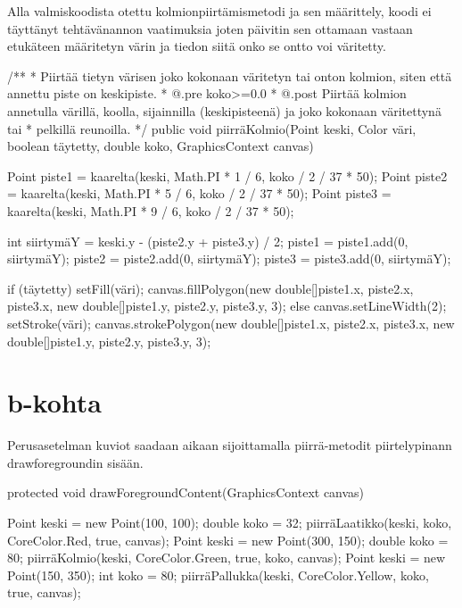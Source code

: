 Alla valmiskoodista otettu kolmionpiirtämismetodi ja sen määrittely, koodi ei täyttänyt
tehtävänannon vaatimuksia joten päivitin sen ottamaan vastaan etukäteen määritetyn värin ja
tiedon siitä onko se ontto voi väritetty.
\begin{javacode}
/**
* Piirtää tietyn värisen joko kokonaan väritetyn tai onton kolmion, siten että annettu piste on keskipiste.
* @.pre koko>=0.0
* @.post Piirtää kolmion annetulla värillä, koolla, sijainnilla (keskipisteenä) ja joko kokonaan väritettynä tai
* pelkillä reunoilla.
*/
    public void piirräKolmio(Point keski, Color väri, boolean täytetty, double koko, GraphicsContext canvas) {
        Point piste1 = kaarelta(keski, Math.PI * 1 / 6, koko / 2 / 37 * 50);
        Point piste2 = kaarelta(keski, Math.PI * 5 / 6, koko / 2 / 37 * 50);
        Point piste3 = kaarelta(keski, Math.PI * 9 / 6, koko / 2 / 37 * 50);

        int siirtymäY = keski.y - (piste2.y + piste3.y) / 2;
        piste1 = piste1.add(0, siirtymäY);
        piste2 = piste2.add(0, siirtymäY);
        piste3 = piste3.add(0, siirtymäY);
    
    if (täytetty){
      setFill(väri);
      canvas.fillPolygon(new double[]{piste1.x, piste2.x, piste3.x}, new double[]{piste1.y, piste2.y, piste3.y}, 3);
    } else{
      canvas.setLineWidth(2);
            setStroke(väri);
            canvas.strokePolygon(new double[]{piste1.x, piste2.x, piste3.x}, new double[]{piste1.y, piste2.y, piste3.y}, 3);
    }
        
    }
\end{javacode}


\section{b-kohta}
\label{b-kohta}
Perusasetelman kuviot saadaan aikaan sijoittamalla piirrä-metodit piirtelypinann drawforegroundin sisään.
\begin{javacode}
    protected void drawForegroundContent(GraphicsContext canvas) {

        {
            Point keski = new Point(100, 100);
            double koko = 32;
            piirräLaatikko(keski, koko, CoreColor.Red, true, canvas);
        }
        {
            Point keski = new Point(300, 150);
            double koko = 80;
            piirräKolmio(keski, CoreColor.Green, true, koko, canvas);
        }
        {
            Point keski = new Point(150, 350);
            int koko = 80; 
            piirräPallukka(keski, CoreColor.Yellow, koko, true, canvas);
        }
    }
\end{javacode}

